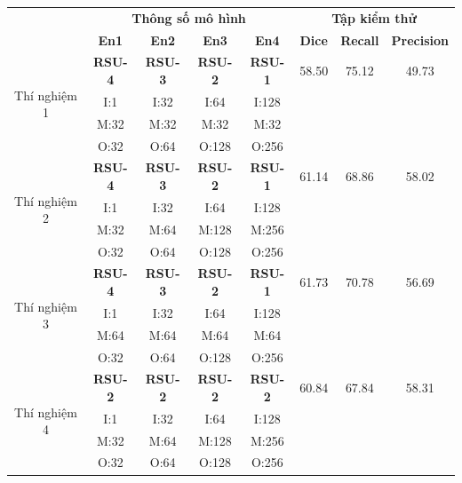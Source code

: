 \begin{table}[H]
    \centering
    \begin{tabular}{c|c c c c|c c c}
    \Xhline{3\arrayrulewidth}
        \multirow{2}{*}{\textbf{Thí nghiệm}} & \multicolumn{4}{c|}{\textbf{Thông số mô hình}} & \multicolumn{3}{c}{\textbf{Tập kiểm thử}} \\
        & \textbf{En1} & \textbf{En2} & \textbf{En3} & \textbf{En4} & \textbf{Dice} & \textbf{Recall} & \textbf{Precision} \\ 
        \hline
        \multirow{4}{*}{Thí nghiệm 1} & \textbf{RSU-4} & \textbf{RSU-3} & \textbf{RSU-2} & \textbf{RSU-1} & 58.50 & 75.12 & 49.73 \\
                                      & I:1  & I:32 & I:64 & I:128 \\ 
                                      & M:32 & M:32 & M:32 & M:32 \\
                                      & O:32 & O:64 & O:128 & O:256 \\
        \hline
        \multirow{4}{*}{Thí nghiệm 2} & \textbf{RSU-4} & \textbf{RSU-3} & \textbf{RSU-2} & \textbf{RSU-1} & 61.14 & 68.86 & 58.02 \\
                                      & I:1  & I:32 & I:64 & I:128 \\ 
                                      & M:32 & M:64 & M:128 & M:256 \\
                                      & O:32 & O:64 & O:128 & O:256 \\
        \hline
        \multirow{4}{*}{Thí nghiệm 3} & \textbf{RSU-4} & \textbf{RSU-3} & \textbf{RSU-2} & \textbf{RSU-1} & 61.73 & 70.78 & 56.69 \\
                                      & I:1  & I:32 & I:64 & I:128 \\ 
                                      & M:64 & M:64 & M:64 & M:64 \\
                                      & O:32 & O:64 & O:128 & O:256 \\
        \hline
        \multirow{4}{*}{Thí nghiệm 4} & \textbf{RSU-2} & \textbf{RSU-2} & \textbf{RSU-2} & \textbf{RSU-2} & 60.84 & 67.84 & 58.31 \\
                                      & I:1  & I:32 & I:64 & I:128  \\ 
                                      & M:32 & M:64 & M:128 & M:256 \\
                                      & O:32 & O:64 & O:128 & O:256 \\

\end{tabular}
\end{table}
